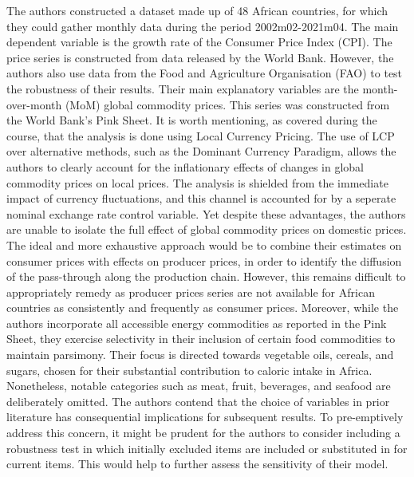 \documentclass[11pt]{article}
\newcommand{\bb}{\bigbreak\noindent}
\begin{document}
\begin{spacing}{2}
		The authors constructed a dataset made up of 48 African countries, for which they could gather monthly data during the period 2002m02-2021m04. The main dependent variable is the growth rate of the Consumer Price Index (CPI). The price series is constructed from data released by the World Bank. However, the authors also use data from the Food and Agriculture Organisation (FAO) to test the robustness of their results. Their main explanatory variables are the month-over-month (MoM) global commodity prices. This series was constructed from the World Bank's Pink Sheet. 
		\bb
		It is worth mentioning, as covered during the course, that the analysis is done using Local Currency Pricing. 
		The use of LCP over alternative methods, such as the Dominant Currency Paradigm, allows the authors to clearly account for the inflationary effects of changes in global commodity prices on local prices. The analysis is shielded from the immediate impact of currency fluctuations, and this channel is accounted for by a seperate nominal exchange rate control variable. Yet despite these advantages, the authors are unable to isolate the full effect of global commodity prices on domestic prices. The ideal and more exhaustive approach would be to combine their estimates on consumer prices with effects on producer prices, in order to identify the diffusion of the pass-through along the production chain. However, this remains difficult to appropriately remedy as producer prices series are not available for African countries as consistently and frequently as consumer prices.
		\bb
		Moreover, while the authors incorporate all accessible energy commodities as reported in the Pink Sheet, they exercise selectivity in their inclusion of certain food commodities to maintain parsimony. Their focus is directed towards vegetable oils, cereals, and sugars, chosen for their substantial contribution to caloric intake in Africa. Nonetheless, notable categories such as meat, fruit, beverages, and seafood are deliberately omitted. The authors contend that the choice of variables in prior literature has consequential implications for subsequent results.  To pre-emptively address this concern, it might be prudent for the authors to consider including a robustness test in which initially excluded items are included or substituted in for current items. This would help to further assess the sensitivity of their model.
		
		

\end{spacing}
\end{document}
